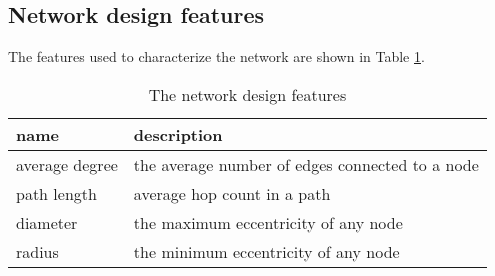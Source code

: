 \documentclass[12pt]{article}
\theoremstyle{definition}
\begin{document}
\subsection{Network design features}
The features used to characterize the network are shown in Table \ref{tab:features}.
\begin{table}[htb]
  \centering
  \begin{tabularx}{\textwidth}{|l|X|} \hline
    name & description \\ \hline
    average degree & the average number of edges connected to a node \\ \hline
    path length & average hop count in a path \\ \hline
    diameter & the maximum eccentricity of any node \\ \hline
    radius & the minimum eccentricity of any node \\ \hline
    
  \end{tabularx}
  \caption{The network design features}
  \label{tab:features}
\end{table}
\end{document}
